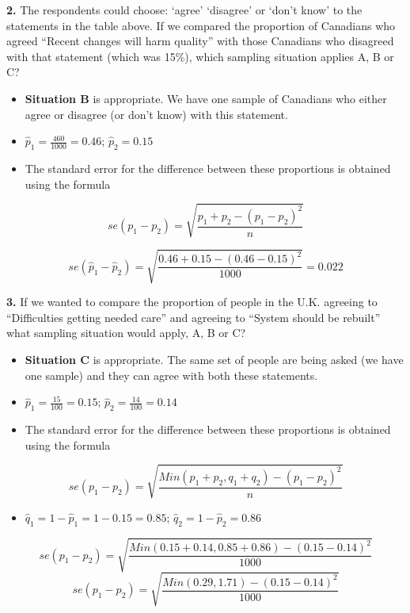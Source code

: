 \documentclass[
  oneside]{krantz}
\providecommand{\tightlist}{%
  \setlength{\itemsep}{0pt}\setlength{\parskip}{0pt}}
\begin{document}
\textbf{2.} The respondents could choose: `agree' `disagree' or `don't know' to the statements in the table above. If we compared the proportion of Canadians who agreed ``Recent changes will harm quality'' with those Canadians who disagreed with that statement (which was 15\%), which sampling situation applies A, B or C?

\begin{itemize}
\item
  \textbf{Situation B} is appropriate. We have one sample of Canadians who either agree or disagree (or don't know) with this statement.
\item
  \(\hat p_1 = \frac{460}{1000} = 0.46\); \(\hat p_2 = 0.15\)
\item
  The standard error for the difference between these proportions is obtained using the formula
\end{itemize}

\[se(p_1-p_2) =\sqrt{\frac{p_1+ p_2-(p_1-p_2)^2}{n}}\]

\[se(\hat p_1-\hat p_2) =\sqrt{\frac{0.46+ 0.15-(0.46-0.15)^2}{1000}}=0.022\]

\textbf{3.} If we wanted to compare the proportion of people in the U.K. agreeing to ``Difficulties getting needed care'' and agreeing to ``System should be rebuilt'' what sampling situation would apply, A, B or C?

\begin{itemize}
\item
  \textbf{Situation C} is appropriate. The same set of people are being asked (we have one sample) and they can agree with both these statements.
\item
  \(\hat p_1 = \frac{15}{100} = 0.15\); \(\hat p_2 = \frac{14}{100} = 0.14\)
\item
  The standard error for the difference between these proportions is obtained using the formula
\end{itemize}

\[se(p_1-p_2) = \sqrt{\frac{Min(p_1 + p_2, q_1 + q_2)-(p_1-p_2)^2}{n}}\]

\begin{itemize}
\tightlist
\item
  \(\hat q_1 = 1 - \hat p_1 = 1 - 0.15 = 0.85\); \(\hat q_2 = 1 - \hat p_2 = 0.86\)
\end{itemize}

\[se(p_1-p_2) = \sqrt{\frac{Min(0.15 + 0.14, 0.85 + 0.86)-(0.15-0.14)^2}{1000}}\]
\[se(p_1-p_2) = \sqrt{\frac{Min(0.29, 1.71)-(0.15-0.14)^2}{1000}}\]
\end{document}
